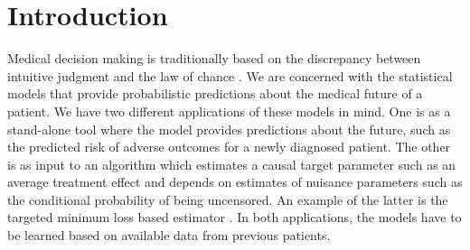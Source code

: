 \documentclass[numsec,webpdf,contemporary,medium,namedate]{oup-authoring-template}%
\theoremstyle{thmstyleone}%
\theoremstyle{thmstyletwo}%
\theoremstyle{thmstylethree}%
\newcommand{\1}{\mathds{1}}
\begin{document}

\maketitle

\section{Introduction}
\label{sec:introduction}

Medical decision making is traditionally based on the discrepancy
between intuitive judgment and the law of chance
\citep{redelmeier1995probability}. We are concerned with the
statistical models that provide probabilistic predictions about the
medical future of a patient. We have two different applications of
these models in mind. One is as a stand-alone tool where the model
provides predictions about the future, such as the predicted risk of
adverse outcomes for a newly diagnosed patient. The other is as input
to an algorithm which estimates a causal target parameter such as an
average treatment effect and depends on estimates of nuisance
parameters such as the conditional probability of being uncensored.
An example of the latter is the targeted minimum loss based estimator
\citep{rytgaard2022targeted}. In both applications, the models have to
be learned based on available data from previous patients.
\end{document}
